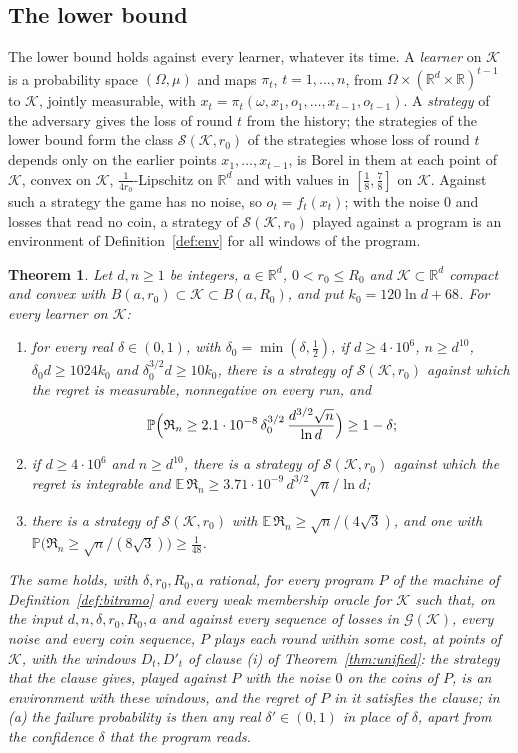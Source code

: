 \documentclass[11pt]{amsart}
\newtheorem{theorem}{Theorem}[section]
\theoremstyle{definition}
\numberwithin{equation}{section}
\newcommand{\R}{\mathbb{R}}
\newcommand{\E}{\mathbb{E}}
\newcommand{\Prob}{\mathbb{P}}
\newcommand{\cK}{\mathcal{K}}
\newcommand{\cG}{\mathscr{G}}
\newcommand{\Reg}{\mathfrak{R}}
\begin{document}
\subsection{The lower bound}\label{sec:intro-lower}

The lower bound holds against every learner, whatever its time. A \emph{learner} on $\cK$ is a probability space $(\Omega,\mu)$ and maps $\pi_t$, $t=1,\dots,n$, from $\Omega\times(\R^d\times\R)^{t-1}$ to $\cK$, jointly measurable, with $x_t=\pi_t(\omega,x_1,o_1,\dots,x_{t-1},o_{t-1})$. A \emph{strategy} of the adversary gives the loss of round $t$ from the history; the strategies of the lower bound form the class $\mathcal S(\cK,r_0)$ of the strategies whose loss of round $t$ depends only on the earlier points $x_1,\dots,x_{t-1}$, is Borel in them at each point of $\cK$, convex on $\cK$, $\frac1{4r_0}$-Lipschitz on $\R^d$ and with values in $[\frac18,\frac78]$ on $\cK$. Against such a strategy the game has no noise, so $o_t=f_t(x_t)$; with the noise $0$ and losses that read no coin, a strategy of $\mathcal S(\cK,r_0)$ played against a program is an environment of Definition~\ref{def:env} for all windows of the program.

\begin{theorem}\label{thm:lowerU}
Let $d,n\ge1$ be integers, $a\in\R^d$, $0<r_0\le R_0$ and $\cK\subset\R^d$ compact and convex with $B(a,r_0)\subset\cK\subset B(a,R_0)$, and put $k_0=120\ln d+68$. For every learner on $\cK$:
\begin{enumerate}[label=(\alph*)]
\item for every real $\delta\in(0,1)$, with $\delta_0=\min(\delta,\frac12)$, if $d\ge4\cdot10^6$, $n\ge d^{10}$, $\delta_0d\ge1024k_0$ and $\delta_0^{3/2}d\ge10k_0$, there is a strategy of $\mathcal S(\cK,r_0)$ against which the regret is measurable, nonnegative on every run, and
\[
\Prob\Bigl(\Reg_n\ge2.1\cdot10^{-8}\,\delta_0^{3/2}\,\frac{d^{3/2}\sqrt n}{\ln d}\Bigr)\ge1-\delta;
\]
\item if $d\ge4\cdot10^6$ and $n\ge d^{10}$, there is a strategy of $\mathcal S(\cK,r_0)$ against which the regret is integrable and $\E\,\Reg_n\ge3.71\cdot10^{-9}\,d^{3/2}\sqrt n/\ln d$;
\item there is a strategy of $\mathcal S(\cK,r_0)$ with $\E\,\Reg_n\ge\sqrt n/(4\sqrt3)$, and one with $\Prob\bigl(\Reg_n\ge\sqrt n/(8\sqrt3)\bigr)\ge\frac1{48}$.
\end{enumerate}
The same holds, with $\delta,r_0,R_0,a$ rational, for every program $P$ of the machine of Definition~\ref{def:bitramo} and every weak membership oracle for $\cK$ such that, on the input $d,n,\delta,r_0,R_0,a$ and against every sequence of losses in $\cG(\cK)$, every noise and every coin sequence, $P$ plays each round within some cost, at points of $\cK$, with the windows $D_t,D'_t$ of clause (i) of Theorem~\ref{thm:unified}: the strategy that the clause gives, played against $P$ with the noise $0$ on the coins of $P$, is an environment with these windows, and the regret of $P$ in it satisfies the clause; in (a) the failure probability is then any real $\delta'\in(0,1)$ in place of $\delta$, apart from the confidence $\delta$ that the program reads.
\end{theorem}
\end{document}
